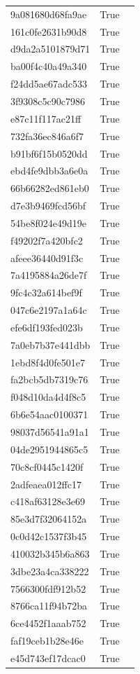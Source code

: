 \begin{tabular}{lrl}
9a081680d68fa9ae & True &  \\
161c0fe2631b90d8 & True &  \\
d9da2a5101879d71 & True &  \\
ba00f4c40a49a340 & True &  \\
f24dd5ae67adc533 & True &  \\
3f9308c5c90c7986 & True &  \\
e87c11f117ac21ff & True &  \\
732fa36ec846a6f7 & True &  \\
b91bf6f15b0520dd & True &  \\
ebd4fe9dbb3a6e0a & True &  \\
66b66282ed861eb0 & True &  \\
d7e3b9469fcd56bf & True &  \\
54be8f024e49d19e & True &  \\
f49202f7a420bfc2 & True &  \\
afeee36440d91f3c & True &  \\
7a4195884a26de7f & True &  \\
9fc4c32a614bef9f & True &  \\
047c6e2197a1a64c & True &  \\
efe6df193fed023b & True &  \\
7a0eb7b37e441dbb & True &  \\
1ebd8f4d0fe501e7 & True &  \\
fa2bcb5db7319c76 & True &  \\
f048d10da4d4f8c5 & True &  \\
6b6e54aac0100371 & True &  \\
98037d56541a91a1 & True &  \\
04de2951944865c5 & True &  \\
70c8cf0445c1420f & True &  \\
2adfeaea012ffc17 & True &  \\
c418af63128e3e69 & True &  \\
85e3d7f32064152a & True &  \\
0c0d42c1537f3b45 & True &  \\
410032b345b6a863 & True &  \\
3dbe23a4ca338222 & True &  \\
7566300fdf912b52 & True &  \\
8766ca11f94b72ba & True &  \\
6ce4452f1aaab752 & True &  \\
faf19ceb1b28e46e & True &  \\
e45d743ef17dcac0 & True &  \\

\end{tabular}
